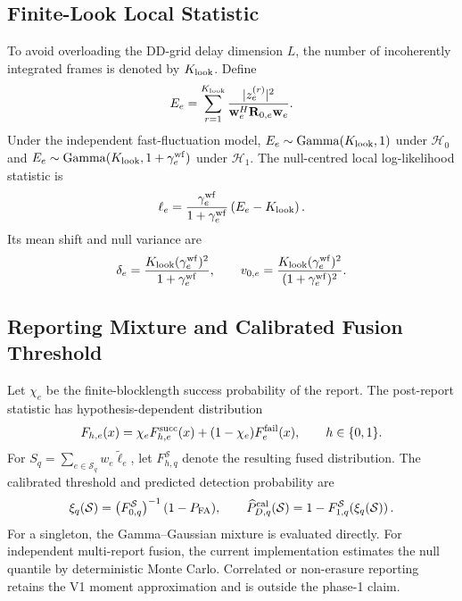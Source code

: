 \subsection{Finite-Look Local Statistic}

To avoid overloading the DD-grid delay dimension $L$, the number of
incoherently integrated frames is denoted by $K_{\rm look}$.  Define
\begin{equation}
 E_e=\sum_{r=1}^{K_{\rm look}}
 \frac{|z_e^{(r)}|^2}{\mathbf w_e^{H}\mathbf R_{0,e}\mathbf w_e}.
 \label{eq:v2_integrated_energy}
\end{equation}
Under the independent fast-fluctuation model,
$E_e\sim\operatorname{Gamma}(K_{\rm look},1)$ under $\mathcal H_0$ and
$E_e\sim\operatorname{Gamma}(K_{\rm look},1+\gamma_e^{\rm wf})$ under
$\mathcal H_1$.  The null-centred local log-likelihood statistic is
\begin{equation}
 \ell_e=
 \frac{\gamma_e^{\rm wf}}{1+\gamma_e^{\rm wf}}
 \left(E_e-K_{\rm look}\right).
 \label{eq:v2_waveform_llr}
\end{equation}
Its mean shift and null variance are
\begin{equation}
 \delta_e=\frac{K_{\rm look}(\gamma_e^{\rm wf})^2}
 {1+\gamma_e^{\rm wf}},\qquad
 v_{0,e}=\frac{K_{\rm look}(\gamma_e^{\rm wf})^2}
 {(1+\gamma_e^{\rm wf})^2}.
 \label{eq:v2_waveform_llr_moments}
\end{equation}

\subsection{Reporting Mixture and Calibrated Fusion Threshold}

Let $\chi_e$ be the finite-blocklength success probability of the report.  The
post-report statistic has hypothesis-dependent distribution
\begin{equation}
 F_{h,e}(x)=\chi_e F_{h,e}^{\rm succ}(x)
 +(1-\chi_e)F_e^{\rm fail}(x),\qquad h\in\{0,1\}.
 \label{eq:v2_report_mixture}
\end{equation}
For $S_q=\sum_{e\in\mathcal S_q}w_e\widetilde\ell_e$, let
$F_{h,q}^{\mathcal S}$ denote the resulting fused distribution.  The
calibrated threshold and predicted detection probability are
\begin{equation}
 \xi_q(\mathcal S)=
 \left(F_{0,q}^{\mathcal S}\right)^{-1}(1-P_{\rm FA}),\qquad
 \widehat P_{D,q}^{\rm cal}(\mathcal S)=
 1-F_{1,q}^{\mathcal S}\!\left(\xi_q(\mathcal S)\right).
 \label{eq:v2_calibrated_pd}
\end{equation}
For a singleton, the Gamma--Gaussian mixture is evaluated directly.  For
independent multi-report fusion, the current implementation estimates the null
quantile by deterministic Monte Carlo.  Correlated or non-erasure reporting
retains the V1 moment approximation and is outside the phase-1 claim.

